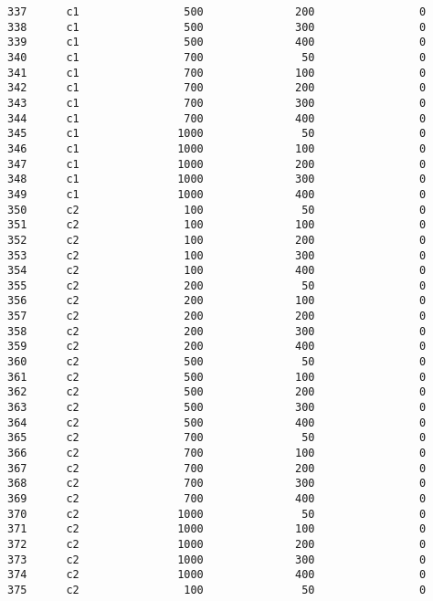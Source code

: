 \documentclass[11pt]{article}
\begin{document}
\begin{Verbatim}[commandchars=\\\{\}]
337      c1                500              200                0   
338      c1                500              300                0   
339      c1                500              400                0   
340      c1                700               50                0   
341      c1                700              100                0   
342      c1                700              200                0   
343      c1                700              300                0   
344      c1                700              400                0   
345      c1               1000               50                0   
346      c1               1000              100                0   
347      c1               1000              200                0   
348      c1               1000              300                0   
349      c1               1000              400                0   
350      c2                100               50                0   
351      c2                100              100                0   
352      c2                100              200                0   
353      c2                100              300                0   
354      c2                100              400                0   
355      c2                200               50                0   
356      c2                200              100                0   
357      c2                200              200                0   
358      c2                200              300                0   
359      c2                200              400                0   
360      c2                500               50                0   
361      c2                500              100                0   
362      c2                500              200                0   
363      c2                500              300                0   
364      c2                500              400                0   
365      c2                700               50                0   
366      c2                700              100                0   
367      c2                700              200                0   
368      c2                700              300                0   
369      c2                700              400                0   
370      c2               1000               50                0   
371      c2               1000              100                0   
372      c2               1000              200                0   
373      c2               1000              300                0   
374      c2               1000              400                0   
375      c2                100               50                0   

\end{Verbatim}
\end{document}
